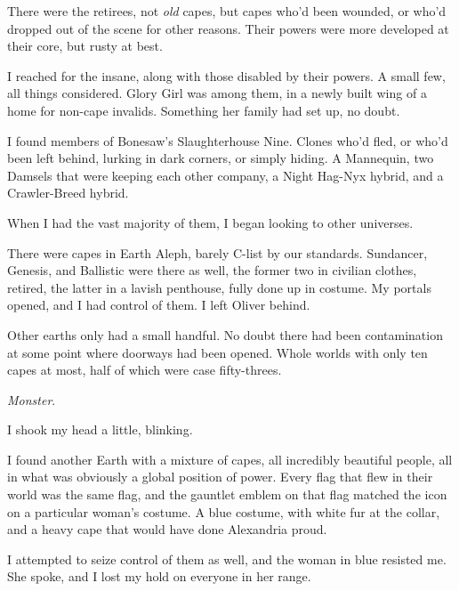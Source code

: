 There were the retirees, not \emph{old} capes, but capes who'd been wounded, or who'd dropped out of the scene for other reasons.  Their powers were more developed at their core, but rusty at best.



I reached for the insane, along with those disabled by their powers.  A small few, all things considered.  Glory Girl was among them, in a newly built wing of a home for non-cape invalids.  Something her family had set up, no doubt.



I found members of Bonesaw's Slaughterhouse Nine.  Clones who'd fled, or who'd been left behind, lurking in dark corners, or simply hiding.  A Mannequin, two Damsels that were keeping each other company, a Night Hag-Nyx hybrid, and a Crawler-Breed hybrid.



When I had the vast majority of them, I began looking to other universes.



There were capes in Earth Aleph, barely C-list by our standards.  Sundancer, Genesis, and Ballistic were there as well, the former two in civilian clothes, retired, the latter in a lavish penthouse, fully done up in costume.  My portals opened, and I had control of them.  I left Oliver behind.



Other earths only had a small handful.  No doubt there had been contamination at some point where doorways had been opened.  Whole worlds with only ten capes at most, half of which were case fifty-threes.



\emph{Monster}.



I shook my head a little, blinking.



I found another Earth with a mixture of capes, all incredibly beautiful people, all in what was obviously a global position of power.  Every flag that flew in their world was the same flag, and the gauntlet emblem on that flag matched the icon on a particular woman's costume.  A blue costume, with white fur at the collar, and a heavy cape that would have done Alexandria proud.



I attempted to seize control of them as well, and the woman in blue resisted me.  She spoke, and I lost my hold on everyone in her range.



